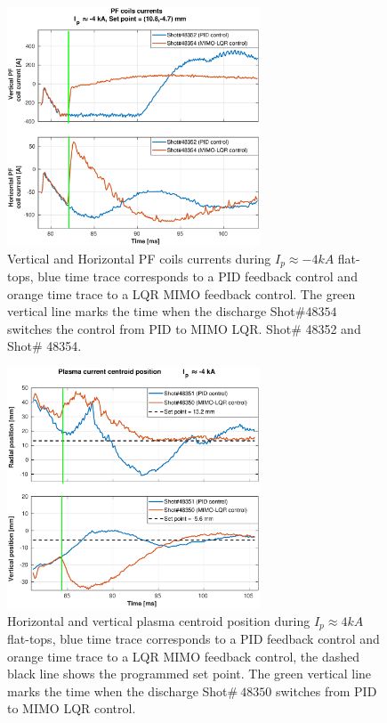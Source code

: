 \begin{figure}
	\centering
	\includegraphics[width=0.67\textwidth]{Chp5/PIDvsMIMO_352_354_curr_2.eps}
	\caption{ Vertical and Horizontal PF coils currents during  $I_p\approx -4kA$  flat-tops, blue time trace corresponds to a PID feedback control and orange time trace to a LQR MIMO feedback control. The green vertical line marks the time  when the  discharge Shot$\# 48354$ switches the control from PID to MIMO LQR. Shot$\#$ 48352 and Shot$\#$ 48354.}
\end{figure}


\begin{figure}
	\centering
	\includegraphics[width=0.67\textwidth]{Chp5/PIDvsMIMO_351_350_2.eps}
	\caption{Horizontal and vertical plasma centroid position during  $I_p\approx 4kA$  flat-tops, blue time trace corresponds to a PID feedback control and orange time trace to a LQR MIMO feedback control, the dashed black line shows the programmed set point. The green vertical line marks the time  when the  discharge Shot$\# ~48350$ switches  from PID to MIMO LQR control.}
\end{figure}

